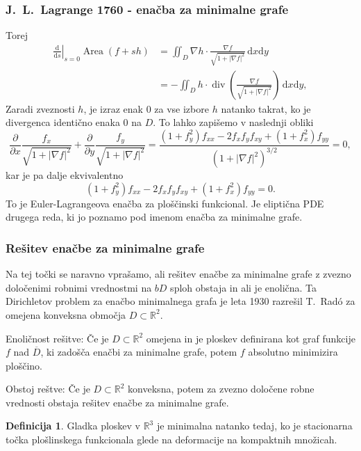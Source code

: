 \documentclass[8pt]{beamer}
\theoremstyle{definition}
\newtheorem{definicija}{Definicija}
\theoremstyle{remark}
\theoremstyle{plain}
\numberwithin{equation}{section}  %
\begin{document}
\begin{frame}
    \frametitle{J.~L.~Lagrange 1760 - enačba za minimalne grafe}

    Torej
    \begin{align*}
        \left.\frac{\mathrm{d}}{\mathrm{d} s}\right|_{s=0} \operatorname{Area}(f+s h) & =\iint_{D} \nabla h \cdot \frac{\nabla f}{\sqrt{1+|\nabla f|^2}} \, \mathrm{d} x \mathrm{d} y \\
        & =-\iint_{D}h \cdot \operatorname{div}\left(\frac{\nabla f}{\sqrt{1+|\nabla f|^2}}\right) \, \mathrm{d} x \mathrm{d} y,
    \end{align*}
    \pause
    Zaradi zveznosti $h$, je izraz enak $0$ za vse izbore $h$ natanko takrat, ko je divergenca identično enaka $0$ na $D$. To lahko zapišemo v naslednji obliki
    \begin{equation*}
        \frac{\partial}{\partial x} \frac{f_x}{\sqrt{1+|\nabla f|^2}}+\frac{\partial}{\partial y} \frac{f_y}{\sqrt{1+|\nabla f|^2}}=\frac{\left(1+f_y^2\right) f_{x x}-2 f_x f_y f_{x y}+\left(1+f_x^2\right) f_{y y}}{\left(1+|\nabla f|^2\right)^{3 / 2}}=0 , 
    \end{equation*}
    kar je pa dalje ekvivalentno
    \begin{equation*}
        \left(1+f_y^2\right) f_{x x}-2 f_x f_y f_{x y}+\left(1+f_x^2\right) f_{y y}=0 .
    \end{equation*}
    \pause
    To je \textcolor{red1}{Euler-Lagrangeova enačba} za ploščinski funkcional. Je eliptična PDE drugega reda, ki jo poznamo pod imenom \textcolor{red1}{enačba za minimalne grafe}.
    
\end{frame}
    
\begin{frame}
    \frametitle{Rešitev enačbe za minimalne grafe}
    
    Na tej točki se naravno vprašamo, ali rešitev enačbe za minimalne grafe z zvezno določenimi robnimi vrednostmi na $bD$ sploh obstaja in ali je enolična. Ta Dirichletov problem za enačbo minimalnega grafa je leta 1930 razrešil T.~Radó za omejena konveksna območja $D \subset \mathbb{R}^2$. 
    \pause 
    \vspace{0.8em}

    \textcolor{red1}{Enoličnost rešitve:} Če je $D\subset \mathbb{R}^2$ omejena in je ploskev definirana kot graf funkcije $f$ nad $\overline{D}$, ki zadošča enačbi za minimalne grafe, potem $f$ absolutno minimizira ploščino.
    \pause 
    \vspace{0.8em}

    \textcolor{red1}{Obstoj reštve:} Če je $D\subset \mathbb{R}^2$ konveksna, potem za zvezno določene robne vrednosti obstaja rešitev enačbe za minimalne grafe. 
    \pause 
    \begin{definicija}
        Gladka ploskev v $\mathbb{R}^3$ je minimalna natanko tedaj, ko je stacionarna točka plošlinskega funkcionala glede na deformacije na kompaktnih množicah.
    \end{definicija}

\end{frame}
\end{document}
